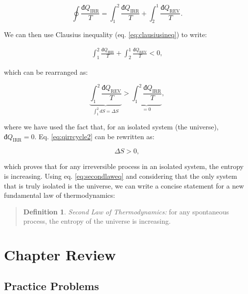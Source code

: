 \documentclass[
  9pt,
]{extbook}
\theoremstyle{definition}
\newtheorem{definition}{Definition}[chapter]
\theoremstyle{definition}
\theoremstyle{definition}
\theoremstyle{remark}
\begin{document}
\begin{equation}
\oint \frac{đQ_{\mathrm{IRR}}}{T} = \int_1^2 \frac{đQ_{\mathrm{IRR}}}{T} + \int_2^1 \frac{đQ_{\mathrm{REV}}}{T}.
\label{eq:qirrcycle}
\end{equation}

We can then use Clausius inequality (eq. \eqref{eq:clausiusineq}) to write:

\begin{equation}
\begin{aligned}
\int_1^2 \frac{đQ_{\mathrm{IRR}}}{T} + \int_2^1 \frac{đQ_{\mathrm{REV}}}{T} < 0,
\end{aligned}
\label{eq:qirrcycle1}
\end{equation}

which can be rearranged as:

\begin{equation}
\underbrace{\int_1^2 \frac{đQ_{\mathrm{REV}}}{T}}_{\int_1^2 dS = \Delta S} > \underbrace{\int_1^2 \frac{đQ_{\mathrm{IRR}}}{T}}_{=0},
\label{eq:qirrcycle2}
\end{equation}

where we have used the fact that, for an isolated system (the universe), \(đQ_{\mathrm{IRR}}=0\). Eq. \eqref{eq:qirrcycle2} can be rewritten as:

\begin{equation}
\Delta S > 0,
\label{eq:secondlaweq}
\end{equation}

which proves that for any irreversible process in an isolated system, the entropy is increasing. Using eq. \eqref{eq:secondlaweq} and considering that the only system that is truly isolated is the universe, we can write a concise statement for a new fundamental law of thermodynamics:

\begin{quote}
\begin{definition}
\protect\hypertarget{def:secondlawdef}{}{\label{def:secondlawdef} }\emph{Second Law of Thermodynamics:} for any spontaneous process, the entropy of the universe is increasing.
\end{definition}
\end{quote}

\hypertarget{rev6}{%
\section{Chapter Review}\label{rev6}}

\hypertarget{exer6}{%
\subsection{Practice Problems}\label{exer6}}
\end{document}
